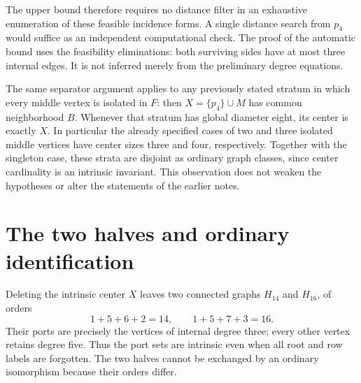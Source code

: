 \documentclass[11pt]{article}
\begin{document}
The upper bound therefore requires no distance filter in an exhaustive
enumeration of these feasible incidence forms. A single distance search
from $p_4$ would suffice as an independent computational check. The proof
of the automatic bound uses the feasibility eliminations: both surviving
sides have at most three internal edges. It is not inferred merely from
the preliminary degree equations.

The same separator argument applies to any previously stated stratum
in which every middle vertex is isolated in $F$: then
$X=\{p_4\}\cup M$ has common neighborhood $B$. Whenever that stratum
has global diameter eight, its center is exactly $X$. In particular the
already specified cases of two and three isolated middle vertices have
center sizes three and four, respectively. Together with the singleton
case, these strata are disjoint as ordinary graph classes, since center
cardinality is an intrinsic invariant. This observation does not weaken
the hypotheses or alter the statements of the earlier notes.

\section*{The two halves and ordinary identification}

Deleting the intrinsic center $X$ leaves two connected graphs $H_{14}$
and $H_{16}$, of orders
\[
 1+5+6+2=14,\qquad1+5+7+3=16.
\]
Their ports are precisely the vertices of internal degree three; every
other vertex retains degree five. Thus the port sets are intrinsic even
when all root and row labels are forgotten. The two halves cannot be
exchanged by an ordinary isomorphism because their orders differ.
\end{document}
